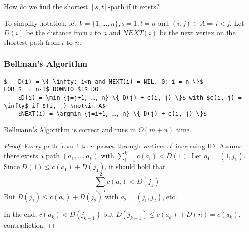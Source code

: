 \begin{qstn}
How do we find the shortest $[s, t]$-path if it exists?
\end{qstn}
To simplify notation, let $V = \{1, …, n\}, s=1, t=n$ and $(i, j) \in A \Rightarrow i < j$.
Let $D(i)$ be the distance from $i$ to $n$ and $NEXT(i)$ be the next vertex on the shortest path from $i$ to $n$.

\subsubsection*{Bellman's Algorithm}
\begin{lstlisting}
$	D(i) = \{ \infty: i<n and NEXT(i) = NIL, 0: i = n \}$
FOR $i = n-1$ DOWNTO $1$ DO
	$D(i) = \min_{j=j+1, …, n} \{ D(j) + c(i, j) \}$ with $c(i, j) = \infty$ if $(i, j) \not\in A$
	$NEXT(i) = \argmin_{j=i+1, …, n} \{ D(j) + c(i, j) \}$
\end{lstlisting}

\begin{thm}
Bellmann's Algorithm is correct and runs in $O(m + n)$ time.
\end{thm}
\begin{proof}
Every path from $1$ to $n$ passes through vertices of increasing ID. Assume there exists a path $(a_1, …, a_k)$ with $\sum_{i=1}^k c(a_i) < D(1)$.
Let $a_1 = (1, j_1)$. Since $D(1) \leq c(a_1) + D(j_1)$, it should hold that
\[ \sum\limits_{i=2}^2 c(a_i) < D(j_1) \]
But $D(j_1) \leq c(a_2) + D(j_2)$ with $a_2 = (j_1, j_2)$, etc.

In the end, $c(a_k) < D(j_{k-1})$ but $D(j_{k-1}) \leq c(a_k) + D(n) = c(a_k)$, contradiction.
\end{proof}
